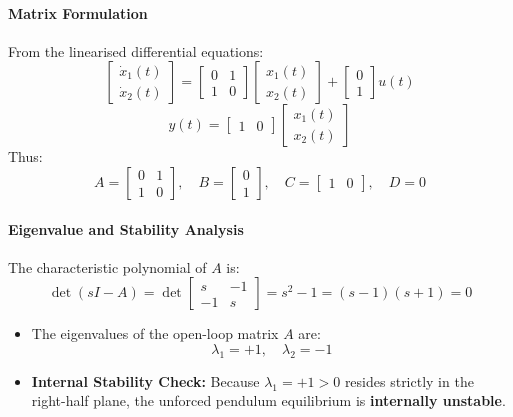\documentclass[12pt,onecolumn,twoside ]{article}
\begin{document}
	\paragraph{Matrix Formulation}
	From the linearised differential equations: \[
	\begin{bmatrix} \dot{x}_1(t) \\ \dot{x}_2(t) \end{bmatrix} = \begin{bmatrix} 0 & 1 \\ 1 & 0 \end{bmatrix} \begin{bmatrix} x_1(t) \\ x_2(t) \end{bmatrix} + \begin{bmatrix} 0 \\ 1 \end{bmatrix} u(t)
	\] \[
	y(t) = \begin{bmatrix} 1 & 0 \end{bmatrix} \begin{bmatrix} x_1(t) \\ x_2(t) \end{bmatrix}
	\]
	Thus: \[
	A = \begin{bmatrix} 0 & 1 \\ 1 & 0 \end{bmatrix}, \quad B = \begin{bmatrix} 0 \\ 1 \end{bmatrix}, \quad C = \begin{bmatrix} 1 & 0 \end{bmatrix}, \quad D = 0
	\]
	\paragraph{Eigenvalue and Stability Analysis}
	The characteristic polynomial of $A$ is: \[
	\det(sI - A) = \det \begin{bmatrix} s & -1 \\ -1 & s \end{bmatrix} = s^2 - 1 = (s - 1)(s + 1) = 0
	\]
	\begin{itemize}
		\item
		The eigenvalues of the open-loop matrix $A$ are: \[
		\lambda_1 = +1, \quad \lambda_2 = -1
		\]
		\item
		\textbf{Internal Stability Check:} Because $\lambda_1 = +1 > 0$ resides strictly in the right-half plane, the unforced pendulum equilibrium is \textbf{internally unstable}.
	\end{itemize}
\end{document}
